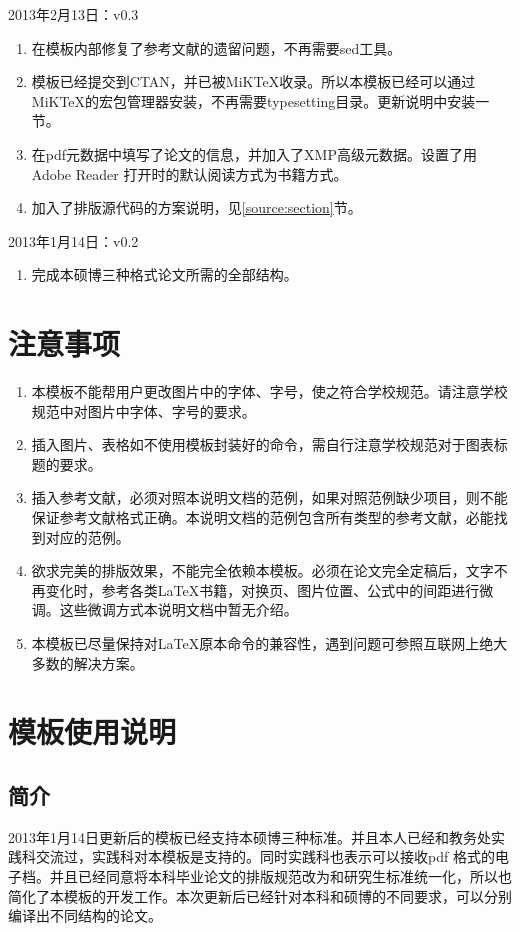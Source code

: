 \noindent
2013年2月13日：v0.3
\begin{enumerate}
\item 在模板内部修复了参考文献的遗留问题，不再需要sed工具。
\item 模板已经提交到CTAN，并已被MiKTeX收录。所以本模板已经可以通过MiKTeX的宏包管理器安装，不再需要typesetting目录。更新说明中安装一节。
\item 在pdf元数据中填写了论文的信息，并加入了XMP高级元数据。设置了用Adobe Reader 打开时的默认阅读方式为书籍方式。
\item 加入了排版源代码的方案说明，见\ref{source:section}节。
\end{enumerate}

\noindent
2013年1月14日：v0.2
\begin{enumerate}
\item 完成本硕博三种格式论文所需的全部结构。
\end{enumerate}
\chapter{注意事项}
\begin{enumerate}
\item 本模板不能帮用户更改图片中的字体、字号，使之符合学校规范。请注意学校规范中对图片中字体、字号的要求。
\item 插入图片、表格如不使用模板封装好的命令，需自行注意学校规范对于图表标题的要求。
\item 插入参考文献，必须对照本说明文档的范例，如果对照范例缺少项目，则不能保证参考文献格式正确。本说明文档的范例包含所有类型的参考文献，必能找到对应的范例。
\item 欲求完美的排版效果，不能完全依赖本模板。必须在论文完全定稿后，文字不再变化时，参考各类\LaTeX{}书籍，对换页、图片位置、公式中的间距进行微调。这些微调方式本说明文档中暂无介绍。
\item 本模板已尽量保持对\LaTeX{}原本命令的兼容性，遇到问题可参照互联网上绝大多数的解决方案。
\end{enumerate}

\chapter{模板使用说明}
\section{简介}
2013年1月14日更新后的模板已经支持本硕博三种标准。并且本人已经和教务处实践科交流过，实践科对本模板是支持的。同时实践科也表示可以接收pdf 格式的电子档。并且已经同意将本科毕业论文的排版规范改为和研究生标准统一化，所以也简化了本模板的开发工作。本次更新后已经针对本科和硕博的不同要求，可以分别编译出不同结构的论文。

